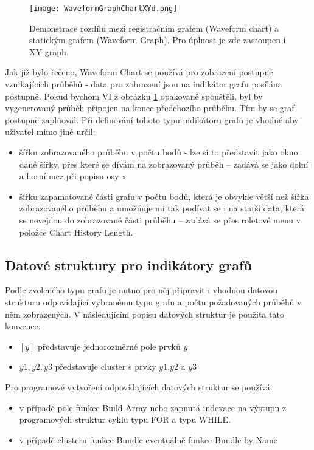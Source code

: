      \begin{figure}[ht!]
       \centering
       \texttt{[image: WaveformGraphChartXYd.png]} 
       \caption[Waveform Graph, Waveform Chart a XY Graph]{Demonstrace rozdílu mezi registračním
               grafem (Waveform chart) a statickým grafem (Waveform Graph). Pro úplnost je zde
               zastoupen i XY graph.}
       \label{EMS:fig_WaveformGraphChartXYd}
     \end{figure} 
     Jak již bylo řečeno, Waveform Chart se používá pro zobrazení postupně vznikajících průběhů -
     data pro zobrazení jsou na indikátor grafu posílána postupně. Pokud bychom VI z obrázku
     \ref{EMS:fig_WaveformGraphChartXYd} opakovaně spouštěli, byl by vygenerovaný průběh připojen
     na konec předchozího průběhu. Tím by se graf postupně zaplňoval. Při definování tohoto
     typu indikátoru grafu je vhodné aby uživatel mimo jiné určil:
     \begin{itemize}
       \item šířku zobrazovaného průběhu v počtu bodů - lze si to představit jako okno dané šířky,
             přes které se dívám na zobrazovaný průběh – zadává se jako dolní a horní mez při popisu
             osy x
       \item šířku zapamatované části grafu v počtu bodů, která je obvykle větší než šířka
             zobrazovaného průběhu a umožňuje mi tak podívat se i na starší data, která se nevejdou
             do zobrazované části průběhu – zadává se přes roletové menu v položce Chart History
             Length. 
     \end{itemize}
     
   \subsection{Datové struktury pro indikátory grafů}
     Podle zvoleného typu grafu je nutno pro něj připravit i vhodnou datovou strukturu odpovídající
     vybranému typu grafu a počtu požadovaných průběhů v něm zobrazených. V následujícím popisu
     datových struktur je použita tato konvence:
     \begin{itemize}
       \item \([y]\) představuje jednorozměrné pole prvků \(y\)
       \item \({y1,y2,y3}\) představuje cluster s prvky \(y1\),\(y2\) a \(y3\) 
     \end{itemize} 
     Pro programové vytvoření odpovídajících datových struktur se používá:
     \begin{itemize}
       \item v případě pole funkce Build Array nebo zapnutá indexace na výstupu z programových
             struktur cyklu typu FOR a typu WHILE. 
       \item v případě clusteru funkce Bundle eventuálně funkce Bundle by Name
     \end{itemize}


